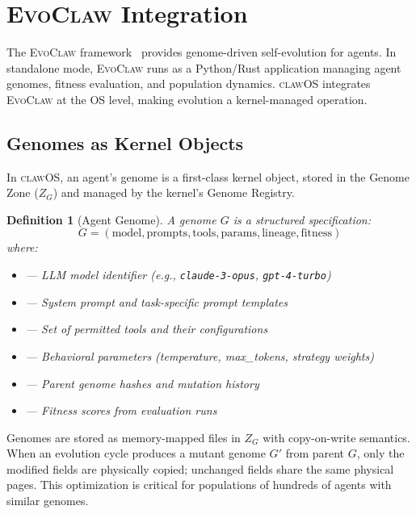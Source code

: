 \documentclass{article}
\newtheorem{definition}{Definition}
\newcommand{\clawos}{\textsc{clawOS}}
\newcommand{\evoclaw}{\textsc{EvoClaw}}
\begin{document}
\section{\evoclaw{} Integration}
\label{sec:evoclaw_integration}

The \evoclaw{} framework~\cite{chen2026evoclaw} provides genome-driven self-evolution for agents. In standalone mode, \evoclaw{} runs as a Python/Rust application managing agent genomes, fitness evaluation, and population dynamics. \clawos{} integrates \evoclaw{} at the OS level, making evolution a kernel-managed operation.

\subsection{Genomes as Kernel Objects}

In \clawos{}, an agent's genome is a first-class kernel object, stored in the Genome Zone ($Z_G$) and managed by the kernel's Genome Registry.

\begin{definition}[Agent Genome]
A genome $G$ is a structured specification:
$$G = (\text{model}, \text{prompts}, \text{tools}, \text{params}, \text{lineage}, \text{fitness})$$
where:
\begin{itemize}[leftmargin=1.5cm]
    \item[\textnormal{model}] — LLM model identifier (e.g., \texttt{claude-3-opus}, \texttt{gpt-4-turbo})
    \item[\textnormal{prompts}] — System prompt and task-specific prompt templates
    \item[\textnormal{tools}] — Set of permitted tools and their configurations
    \item[\textnormal{params}] — Behavioral parameters (temperature, max\_tokens, strategy weights)
    \item[\textnormal{lineage}] — Parent genome hashes and mutation history
    \item[\textnormal{fitness}] — Fitness scores from evaluation runs
\end{itemize}
\end{definition}

Genomes are stored as memory-mapped files in $Z_G$ with copy-on-write semantics. When an evolution cycle produces a mutant genome $G'$ from parent $G$, only the modified fields are physically copied; unchanged fields share the same physical pages. This optimization is critical for populations of hundreds of agents with similar genomes.
\end{document}
